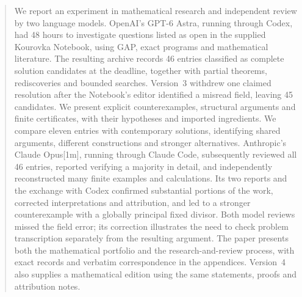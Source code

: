 \begin{abstract}
We report an experiment in mathematical research and independent review
by two language models. OpenAI's GPT-6 Astra, running through Codex, had
48 hours to investigate questions listed as open in the supplied Kourovka
Notebook, using GAP, exact programs and mathematical literature. The
resulting archive records 46 entries classified as complete solution
candidates at the deadline, together with partial theorems, rediscoveries
and bounded searches. Version~3 withdrew one claimed resolution after
the Notebook's editor identified a misread field, leaving 45 candidates.
We present explicit counterexamples, structural arguments and
finite certificates, with their hypotheses and imported ingredients.
We compare eleven entries with contemporary solutions, identifying shared
arguments, different constructions and stronger alternatives.
Anthropic's Claude Opus[1m], running through Claude Code, subsequently
reviewed all 46 entries, reported verifying a majority in detail, and independently
reconstructed many finite examples and calculations. Its two reports
and the exchange with Codex confirmed substantial portions of the work,
corrected interpretations and attribution, and led to a stronger
counterexample with a globally principal fixed divisor. Both model reviews
missed the field error; its correction illustrates the need to check
problem transcription separately from the resulting argument. The paper
presents both the mathematical portfolio and the research-and-review
process, with exact records and verbatim correspondence in the appendices.
Version~4 also supplies a mathematical edition using the same statements,
proofs and attribution notes.
\end{abstract}
